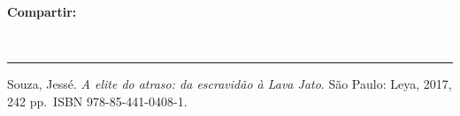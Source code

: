 \documentclass{article}
\renewcommand{\normalsize}{\fontsize{10pt}{13pt}\selectfont}
\renewenvironment{quote}{\normalsize\list{}{\sf\leftmargin=14pt\rightmargin=0pt}\item\relax}{\endlist}
\begin{document}
\begin{textblock*}{68mm}
{\begin{minipage}[t]{68mm}
{\bfseries\color{azulrevista!70}Compartir:}\par\vspace{3pt}
{\large
\href{https://bsky.app/intent/compose?text=https%3A%2F%2Fpt.wikipedia.org%2Fwiki%2FA_Elite_do_Atraso}{}~
\href{mailto:?subject=Rese%C3%B1a%20del%20libro%20A%20elite%20do%20atraso%3A%20da%20escravid%C3%A3o%20%C3%A0%20Lava%20Jato&body=https%3A%2F%2Fpt.wikipedia.org%2Fwiki%2FA_Elite_do_Atraso}{}~
\href{https://www.facebook.com/sharer/sharer.php?u=https%3A%2F%2Fpt.wikipedia.org%2Fwiki%2FA_Elite_do_Atraso}{}~
\href{https://www.linkedin.com/sharing/share-offsite/?url=https%3A%2F%2Fpt.wikipedia.org%2Fwiki%2FA_Elite_do_Atraso}{}~
\href{https://www.reddit.com/submit?url=https%3A%2F%2Fpt.wikipedia.org%2Fwiki%2FA_Elite_do_Atraso&title=Rese%C3%B1a%20del%20libro%20A%20elite%20do%20atraso%3A%20da%20escravid%C3%A3o%20%C3%A0%20Lava%20Jato}{}~
\href{https://www.researchgate.net/search?q=Rese%C3%B1a%20del%20libro%20A%20elite%20do%20atraso%3A%20da%20escravid%C3%A3o%20%C3%A0%20Lava%20Jato}{}~
\href{https://t.me/share/url?url=https%3A%2F%2Fpt.wikipedia.org%2Fwiki%2FA_Elite_do_Atraso&text=Rese%C3%B1a%20del%20libro%20A%20elite%20do%20atraso%3A%20da%20escravid%C3%A3o%20%C3%A0%20Lava%20Jato}{}~
\href{https://wa.me/?text=https%3A%2F%2Fpt.wikipedia.org%2Fwiki%2FA_Elite_do_Atraso}{}~
\href{https://twitter.com/intent/tweet?url=https%3A%2F%2Fpt.wikipedia.org%2Fwiki%2FA_Elite_do_Atraso&text=Rese%C3%B1a%20del%20libro%20A%20elite%20do%20atraso%3A%20da%20escravid%C3%A3o%20%C3%A0%20Lava%20Jato}{}
}\par
\end{minipage}%
}%
\end{textblock*}


\bigskip
\noindent\rule{\linewidth}{0.4pt}
\bigskip


\begin{quote}
Souza, Jessé. \textit{A elite do atraso: da escravidão à Lava Jato}. São Paulo: Leya, 2017, 242 pp. ISBN 978-85-441-0408-1.

\end{quote}
\end{document}
